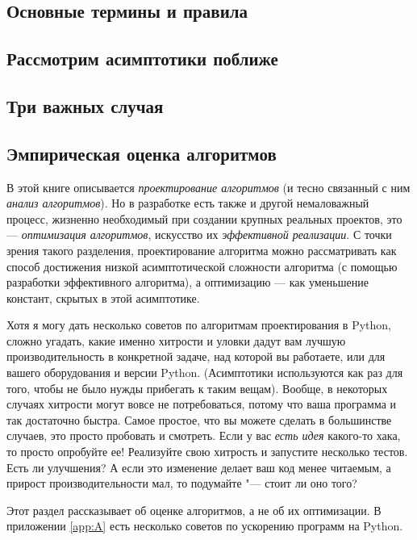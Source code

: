 \subsection{Основные термины и правила}
\subsection{Рассмотрим асимптотики поближе}
\subsection{Три важных случая}
\subsection{Эмпирическая оценка алгоритмов}
\label{sec:empirical-evaluation}

В этой книге описывается\textit{ проектирование алгоритмов} (и тесно связанный с ним\textit{ анализ алгоритмов}). Но в разработке есть также и другой немаловажный процесс, жизненно необходимый при создании крупных реальных проектов, это — \textit{оптимизация алгоритмов}, искусство их \textit{эффективной реализации}. С точки зрения такого разделения, проектирование алгоритма можно рассматривать как способ достижения низкой асимптотической сложности алгоритма (с помощью разработки эффективного алгоритма), а оптимизацию — как уменьшение констант, скрытых в этой асимптотике.

Хотя я могу дать несколько советов по алгоритмам проектирования в Python, сложно угадать, какие именно хитрости и уловки дадут вам лучшую производительность в конкретной задаче, над которой вы работаете, или для вашего оборудования и версии Python. (Асимптотики используются как раз для того, чтобы не было нужды прибегать к таким вещам). Вообще, в некоторых случаях хитрости могут вовсе не потребоваться, потому что ваша программа и так достаточно быстра. Самое простое, что вы можете сделать в большинстве случаев, это просто пробовать и смотреть. Если у вас \textit{есть идея} какого-то хака, то просто опробуйте ее! Реализуйте свою хитрость и запустите несколько тестов. Есть ли улучшения? А если это изменение делает ваш код менее читаемым, а прирост производительности мал, то подумайте "--- стоит ли оно того?

\begin{note}
Этот раздел рассказывает об оценке алгоритмов, а не об их оптимизации. В приложении \ref{app:A} есть несколько советов по ускорению программ на Python.
\end{note}

